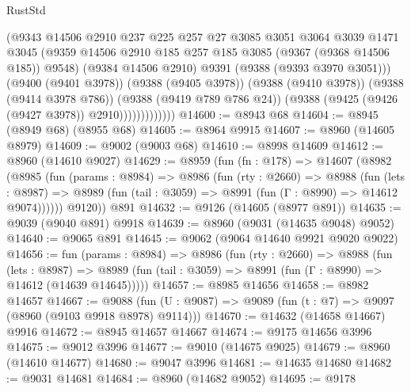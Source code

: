 \begin{lexlean}{RustStd}
\begin{coremodule}
                          (@9343
                            @14506
                            @2910
                            @237
                            @225
                            @257
                            @27
                            @3085
                            @3051
                            @3064
                            @3039
                            @1471
                            @3045
                            (@9359
                              @14506
                              @2910
                              @185
                              @257
                              @185
                              @3085
                              (@9367 (@9368 @14506 @185))
                              @9548)
                            (@9384 @14506 @2910)
                            @9391
                            (@9388 (@9393 @3970 @3051)))
                          (@9400 (@9401 @3978))
                          (@9388 (@9405 @3978))
                          (@9388 (@9410 @3978))
                          (@9388 (@9414 @3978 @786))
                          (@9388 (@9419 @789 @786 @24))
                          (@9388 (@9425 (@9426 (@9427 @3978)) @2910)))))))))))))
@14600 := @8943 @68
@14604 := @8945 (@8949 @68) (@8955 @68)
@14605 := @8964 @9915
@14607 := @8960 (@14605 @8979)
@14609 := @9002 (@9003 @68)
@14610 := @8998 @14609
@14612 := @8960 (@14610 @9027)
@14629 := @8959
    (fun (fn : @178) =>
    @14607
      (@8982
        (@8985
          (fun (params : @8984) =>
          @8986
            (fun (rty : @2660) =>
            @8988
              (fun (lets : @8987) =>
              @8989 (fun (tail : @3059) => @8991 (fun (Γ : @8990) => @14612 @9074))))))
        @9120))
    @891
@14632 := @9126 (@14605 (@8977 @891))
@14635 := @9039 (@9040 @891) @9918
@14639 := @8960 (@9031 (@14635 @9048) @9052)
@14640 := @9065 @891
@14645 := @9062 (@9064 @14640 @9921 @9020 @9022)
@14656 := fun (params : @8984) =>
  @8986
    (fun (rty : @2660) =>
    @8988
      (fun (lets : @8987) =>
      @8989 (fun (tail : @3059) => @8991 (fun (Γ : @8990) => @14612 (@14639 @14645)))))
@14657 := @8985 @14656
@14658 := @8982 @14657
@14667 := @9088 (fun (U : @9087) => @9089 (fun (t : @7) => @9097 (@8960 (@9103 @9918 @8978) @9114)))
@14670 := @14632 (@14658 @14667) @9916
@14672 := @8945 @14657 @14667
@14674 := @9175 @14656 @3996
@14675 := @9012 @3996
@14677 := @9010 (@14675 @9025)
@14679 := @8960 (@14610 @14677)
@14680 := @9047 @3996
@14681 := @14635 @14680
@14682 := @9031 @14681
@14684 := @8960 (@14682 @9052)
@14695 := @9178

\end{coremodule}
\end{lexlean}
